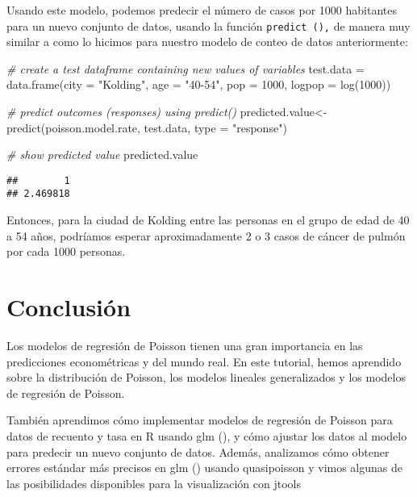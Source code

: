 \documentclass[
]{book}
\newenvironment{Shaded}{\begin{snugshade}}{\end{snugshade}}
\newcommand{\AttributeTok}[1]{\textcolor[rgb]{0.77,0.63,0.00}{#1}}
\newcommand{\CommentTok}[1]{\textcolor[rgb]{0.56,0.35,0.01}{\textit{#1}}}
\newcommand{\DecValTok}[1]{\textcolor[rgb]{0.00,0.00,0.81}{#1}}
\newcommand{\FunctionTok}[1]{\textcolor[rgb]{0.00,0.00,0.00}{#1}}
\newcommand{\NormalTok}[1]{#1}
\newcommand{\OtherTok}[1]{\textcolor[rgb]{0.56,0.35,0.01}{#1}}
\newcommand{\StringTok}[1]{\textcolor[rgb]{0.31,0.60,0.02}{#1}}
\begin{document}
Usando este modelo, podemos predecir el número de casos por 1000 habitantes para un nuevo conjunto de datos, usando la función \texttt{predict\ (),} de manera muy similar a como lo hicimos para nuestro modelo de conteo de datos anteriormente:

\begin{Shaded}
\begin{Highlighting}[]
\CommentTok{\# create a test dataframe containing new values of variables}
\NormalTok{test.data }\OtherTok{=} \FunctionTok{data.frame}\NormalTok{(}\AttributeTok{city =} \StringTok{"Kolding"}\NormalTok{, }\AttributeTok{age =} \StringTok{"40{-}54"}\NormalTok{, }\AttributeTok{pop =} \DecValTok{1000}\NormalTok{, }\AttributeTok{logpop =} \FunctionTok{log}\NormalTok{(}\DecValTok{1000}\NormalTok{))}

\CommentTok{\# predict outcomes (responses) using \textquotesingle{}predict()\textquotesingle{}}
\NormalTok{predicted.value}\OtherTok{\textless{}{-}}\FunctionTok{predict}\NormalTok{(poisson.model.rate, test.data, }\AttributeTok{type =} \StringTok{"response"}\NormalTok{)}

\CommentTok{\# show predicted value}
\NormalTok{predicted.value}
\end{Highlighting}
\end{Shaded}

\begin{verbatim}
##        1 
## 2.469818
\end{verbatim}

Entonces, para la ciudad de Kolding entre las personas en el grupo de edad de 40 a 54 años, podríamos esperar aproximadamente 2 o 3 casos de cáncer de pulmón por cada 1000 personas.

\hypertarget{conclusiuxf3n}{%
\chapter{Conclusión}\label{conclusiuxf3n}}

Los modelos de regresión de Poisson tienen una gran importancia en las predicciones econométricas y del mundo real. En este tutorial, hemos aprendido sobre la distribución de Poisson, los modelos lineales generalizados y los modelos de regresión de Poisson.

También aprendimos cómo implementar modelos de regresión de Poisson para datos de recuento y tasa en R usando glm (), y cómo ajustar los datos al modelo para predecir un nuevo conjunto de datos. Además, analizamos cómo obtener errores estándar más precisos en glm () usando quasipoisson y vimos algunas de las posibilidades disponibles para la visualización con jtools
\end{document}
